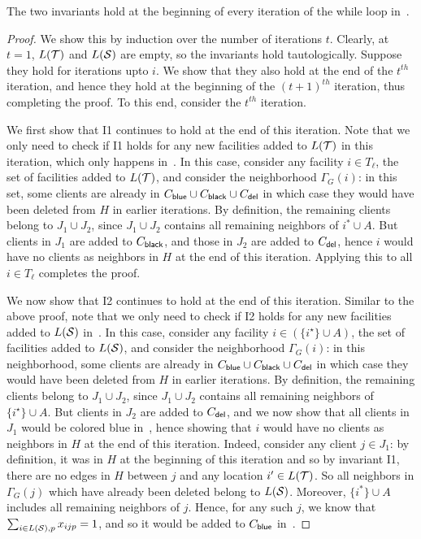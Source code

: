 \begin{claim}
\label{cl:inv}
The two invariants hold at the beginning of every iteration of the while loop in~.
\end{claim}
\begin{proof}
We show this by induction over the number of iterations $t$. Clearly, at $t=1$, $L({\cal T})$ and $L({\cal S})$ are empty, so the invariants hold tautologically. Suppose they hold for iterations upto $i$. We show that they also hold at the end of the $t^{th}$ iteration, and hence they hold at the beginning of the $(t+1)^{th}$ iteration, thus completing the proof. To this end, consider the $t^{th}$ iteration.

\medskip \noindent We first show that I1 continues to hold at the end of this iteration. Note that we only need to check if I1 holds for any new facilities added to $L({\cal T})$ in this iteration, which only happens in~. In this case, consider any facility $i \in T_\ell$, the set of facilities added to $L({\cal T})$, and consider the neighborhood $\Gamma_G(i)$: in this set, some clients are already in $C_{\mathsf{blue}} \cup C_{\mathsf{black}} \cup C_{\mathsf{del}}$ in which case they would have been deleted from $H$ in earlier iterations. By definition, the remaining clients belong to $J_1 \cup J_2$, since $J_1 \cup J_2$ contains all remaining neighbors of $i^* \cup A$. But clients in $J_1$ are added to $C_{\mathsf{black}}$, and those in $J_2$ are added to $C_{\mathsf{del}}$, hence $i$ would have no  clients as neighbors in $H$ at the end of this iteration. Applying this to all $i \in T_\ell$ completes the proof.

\medskip \noindent We now show that I2 continues to hold at the end of this iteration. Similar to the above proof, note that we only need to check if I2 holds for any new facilities added to $L({\cal S})$ in~. In this case, consider any facility $i \in (\{i^\star\} \cup A)$, the set of facilities added to $L({\cal S})$, and consider the neighborhood $\Gamma_G(i)$: in this neighborhood, some clients are already in $C_{\mathsf{blue}} \cup C_{\mathsf{black}} \cup C_{\mathsf{del}}$ in which case they would have been deleted from $H$ in earlier iterations. By definition, the remaining clients belong to $J_1 \cup J_2$, since $J_1 \cup J_2$ contains all remaining neighbors of $\{i^\star \} \cup A$. But clients in $J_2$ are added to $C_{\mathsf{del}}$, and we now show that all clients in $J_1$ would be colored blue in~, hence showing that $i$ would have no clients as neighbors in $H$ at the end of this iteration.
Indeed, consider any client $j \in J_1$: by definition, it was in $H$ at the beginning of this iteration and so by invariant I1, there are no edges in $H$ between $j$ and any location $i' \in L({\cal T})$. So all neighbors in $\Gamma_G(j)$ which have already been deleted belong to $L({\cal S})$. Moreover, $\{i^*\} \cup A$ includes all remaining neighbors of $j$. Hence, for any such $j$, we know that $\sum_{i \in L({\cal S}), p} x_{ijp} = 1$, and so it would be
added to $C_{\mathsf{blue}}$ in~.
\end{proof}

